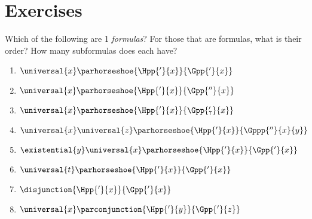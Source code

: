 \section{Exercises}

 Which of the following are \GQL{}1 \emph{formulas}? 
For those that are formulas, what is their order? 
How many subformulas does each have?
\begin{multicols}{2}
\begin{enumerate}
\item {$\universal{\variable{x}}\parhorseshoe{\Hpp{'}{\variable{x}}}{\Gpp{'}{\variable{x}}}$}
\item {$\universal{\variable{x}}\parhorseshoe{\Hpp{'}{\variable{x}}}{\Gpp{''}{\variable{x}}}$}
\item {$\universal{\variable{x}}\parhorseshoe{\Hpp{'}{\variable{x}}}{\Gpp{'_7}{\variable{x}}}$}
\item {$\universal{\variable{x}}\universal{\variable{z}}\parhorseshoe{\Hpp{'}{\variable{x}}}{\Gppp{''}{\variable{x}}{\variable{y}}}$}
\item {$\existential{\variable{y}}\universal{\variable{x}}\parhorseshoe{\Hpp{'}{\variable{x}}}{\Gpp{'}{\variable{x}}}$}
\item {$\universal{\variable{t}}\parhorseshoe{\Hpp{'}{\variable{x}}}{\Gpp{'}{\variable{x}}}$}
\item {$\disjunction{\Hpp{'}{\variable{x}}}{\Gpp{'}{\variable{x}}}$}
\item {$\universal{\variable{x}}\parconjunction{\Hpp{'}{\variable{y}}}{\Gpp{'}{\variable{z}}}$}
\end{enumerate}
\end{multicols}


